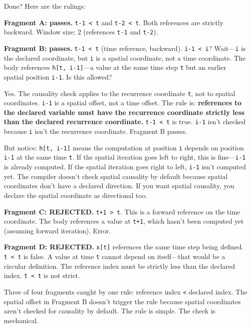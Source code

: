 \documentclass[11pt,titlepage]{article}
\begin{document}
\vspace{2em}

Done? Here are the rulings:

\textbf{Fragment A: passes.} \texttt{t-1\ \textless{}\ t} and
\texttt{t-2\ \textless{}\ t}. Both references are strictly backward.
Window size: 2 (references \texttt{t-1} and \texttt{t-2}).

\textbf{Fragment B: passes.} \texttt{t-1\ \textless{}\ t} (time
reference, backward). \texttt{i-1\ \textless{}\ i}? Wait---\texttt{i} is
the declared coordinate, but \texttt{i} is a spatial coordinate, not a
time coordinate. The body references \texttt{h{[}t,\ i-1{]}}---a value
at the same time step \texttt{t} but an earlier spatial position
\texttt{i-1}. Is this allowed?

Yes. The causality check applies to the recurrence coordinate
\texttt{t}, not to spatial coordinates. \texttt{i-1} is a spatial
offset, not a time offset. The rule is: \textbf{references to the
declared variable must have the recurrence coordinate strictly less than
the declared recurrence coordinate.} \texttt{t-1\ \textless{}\ t} is
true. \texttt{i-1} isn't checked because \texttt{i} isn't the recurrence
coordinate. Fragment B passes.

But notice: \texttt{h{[}t,\ i-1{]}} means the computation at position
\texttt{i} depends on position \texttt{i-1} at the same time \texttt{t}.
If the spatial iteration goes left to right, this is fine---\texttt{i-1}
is already computed. If the spatial iteration goes right to left,
\texttt{i-1} isn't computed yet. The compiler doesn't check spatial
causality by default because spatial coordinates don't have a declared
direction. If you want spatial causality, you declare the spatial
coordinate as directional too.

\textbf{Fragment C: REJECTED.} \texttt{t+1\ \textgreater{}\ t}. This is
a forward reference on the time coordinate. The body references a value
at \texttt{t+1}, which hasn't been computed yet (assuming forward
iteration). Error.

\textbf{Fragment D: REJECTED.} \texttt{x{[}t{]}} references the same
time step being defined. \texttt{t\ \textless{}\ t} is false. A value at
time \texttt{t} cannot depend on itself---that would be a circular
definition. The reference index must be strictly less than the declared
index. \texttt{t\ \textless{}\ t} is not strict.

Three of four fragments caught by one rule: reference index
\texttt{\textless{}} declared index. The spatial offset in Fragment B
doesn't trigger the rule because spatial coordinates aren't checked for
causality by default. The rule is simple. The check is mechanical.
\end{document}
